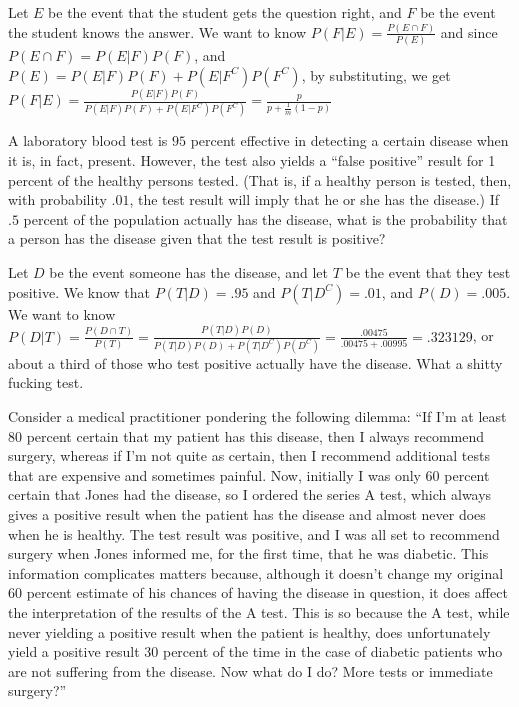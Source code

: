 \documentclass{article}
\begin{document}
\begin{solution}
Let $E$ be the event that the student gets the question right, and $F$ be the event the student knows the answer. We want to know $P(F \vert E) = \frac{P(E \cap F)}{P(E)}$ and since $P(E \cap F) = P(E \vert F)P(F)$, and $P(E) = P(E\vert F)P(F) + P(E\vert F^C)P(F^C)$, by substituting, we get $P(F \vert E) = \frac{P(E \vert F)P(F)}{P(E \vert F)P(F) + P(E\vert F^C)P(F^C)} = \frac{p}{p + \frac{1}{m}(1-p)}$
\end{solution}

\begin{example}
    A laboratory blood test is $95$ percent effective in detecting a certain disease when it is, in fact, present. However, the test also yields a “false positive” result for 1 percent of the healthy persons tested. (That is, if a healthy person is tested, then, with probability $.01$, the test result will imply that he or she has the disease.) If $.5$ percent of the population actually has the disease, what is the probability that a person has the disease given that the test result is positive?
\end{example}

\begin{solution}
Let $D$ be the event someone has the disease, and let $T$ be the event that they test positive. We know that $P(T \vert D) = .95$ and $P(T \vert D^C) = .01$, and $P(D) = .005$. We want to know $P(D \vert T) = \frac{P(D \cap T)}{P(T)}= \frac{P(T \vert D)P(D)}{P(T \vert D)P(D) + P(T \vert D^C)P(D^C)} = \frac{.00475}{.00475 + .00995} = .323129$, or about a third of those who test positive actually have the disease. What a shitty fucking test. 
\end{solution}

\begin{example}
    Consider a medical practitioner pondering the following dilemma: “If I'm at least 80 percent certain that my patient has this disease, then I always recommend surgery, whereas if I'm not quite as certain, then I recommend additional tests that are expensive and sometimes painful. Now, initially I was only 60 percent certain that Jones had the disease, so I ordered the series A test, which always gives a positive result when the patient has the disease and almost never does when he is healthy. The test result was positive, and I was all set to recommend surgery when Jones informed me, for the first time, that he was diabetic. This information complicates matters because, although it doesn't change my original 60 percent estimate of his chances of having the disease in question, it does affect the interpretation of the results of the A test. This is so because the A test, while never yielding a positive result when the patient is healthy, does unfortunately yield a positive result 30 percent of the time in the case of diabetic patients who are not suffering from the disease. Now what do I do? More tests or immediate surgery?”
\end{example}
\end{document}
